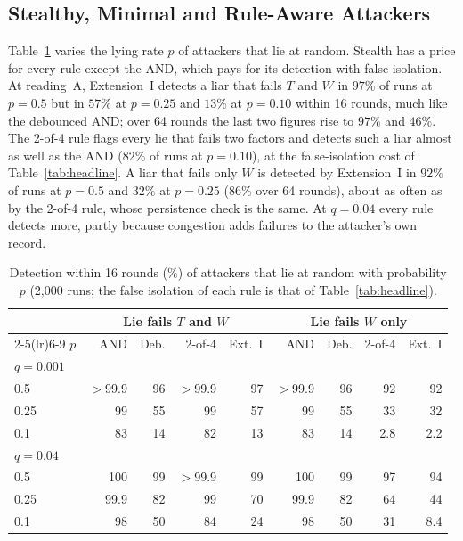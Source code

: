 \documentclass{ieeeaccess}
\begin{document}
\subsection{Stealthy, Minimal and Rule-Aware Attackers}
\label{sec:res-stealth}
Table~\ref{tab:stealth} varies the lying rate $p$ of attackers that lie
at random.  Stealth has a price for every rule except the AND, which
pays for its detection with false isolation.  At reading~A,
Extension~I detects a liar that fails $T$ and $W$ in $97\%$ of runs at
$p=0.5$ but in $57\%$ at $p=0.25$ and $13\%$ at $p=0.10$ within
16 rounds, much like the debounced AND; over 64 rounds the last two
figures rise to $97\%$ and $46\%$.  The 2-of-4 rule flags every lie
that fails two factors and detects such a liar almost as well as the
AND ($82\%$ of runs at $p=0.10$), at the false-isolation cost of
Table~\ref{tab:headline}.  A liar that fails only $W$ is
detected by Extension~I in $92\%$ of runs at $p=0.5$ and $32\%$ at
$p=0.25$ ($86\%$ over 64 rounds), about as often as by the 2-of-4
rule, whose persistence check is the same.  At $q=0.04$ every rule detects more, partly because
congestion adds failures to the attacker's own record.

\begin{table}[!t]
\caption{Detection within 16 rounds (\%) of attackers that lie at random with probability $p$ (2{,}000 runs; the false isolation of each rule is that of Table~\ref{tab:headline}).}
\label{tab:stealth}
\centering
\renewcommand{\arraystretch}{1.08}
\footnotesize
\setlength{\tabcolsep}{1.6pt}
\begin{tabular}{lrrrrrrrr}
\toprule
 & \multicolumn{4}{c}{\textbf{Lie fails $T$ and $W$}} & \multicolumn{4}{c}{\textbf{Lie fails $W$ only}} \\
\cmidrule(lr){2-5}\cmidrule(lr){6-9}
$p$ & AND & Deb. & 2-of-4 & Ext.~I & AND & Deb. & 2-of-4 & Ext.~I \\
\midrule
\multicolumn{9}{l}{$q=0.001$} \\
0.5 & $>$99.9 & 96 & $>$99.9 & 97 & $>$99.9 & 96 & 92 & 92 \\
0.25 & 99 & 55 & 99 & 57 & 99 & 55 & 33 & 32 \\
0.1 & 83 & 14 & 82 & 13 & 83 & 14 & 2.8 & 2.2 \\
\midrule
\multicolumn{9}{l}{$q=0.04$} \\
0.5 & 100 & 99 & $>$99.9 & 99 & 100 & 99 & 97 & 94 \\
0.25 & 99.9 & 82 & 99 & 70 & 99.9 & 82 & 64 & 44 \\
0.1 & 98 & 50 & 84 & 24 & 98 & 50 & 31 & 8.4 \\
\bottomrule
\end{tabular}
\end{table}
\end{document}
